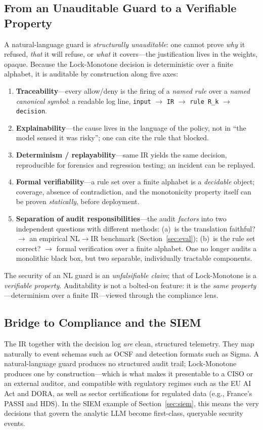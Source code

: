 \documentclass[conference]{IEEEtran}
\begin{document}
\subsection{From an Unauditable Guard to a Verifiable Property}
A natural-language guard is \emph{structurally unauditable}: one cannot
prove \emph{why} it refused, \emph{that} it will refuse, or \emph{what} it
covers---the justification lives in the weights, opaque. Because the
Lock-Monotone decision is deterministic over a finite alphabet, it is
auditable by construction along five axes:
\begin{enumerate}
\item \textbf{Traceability}---every allow/deny is the firing of a
\emph{named rule} over a \emph{named canonical symbol}: a readable log
line, \texttt{input} $\rightarrow$ \texttt{IR} $\rightarrow$
\texttt{rule R\_k} $\rightarrow$ \texttt{decision}.
\item \textbf{Explainability}---the cause lives in the language of the
policy, not in ``the model sensed it was risky''; one can cite the rule
that blocked.
\item \textbf{Determinism / replayability}---same IR yields the same
decision, reproducible for forensics and regression testing; an incident
can be replayed.
\item \textbf{Formal verifiability}---a rule set over a finite alphabet is
a \emph{decidable} object; coverage, absence of contradiction, and the
monotonicity property itself can be proven \emph{statically}, before
deployment.
\item \textbf{Separation of audit responsibilities}---the audit
\emph{factors} into two independent questions with different methods:
(a)~is the translation faithful? $\rightarrow$ an empirical
NL$\rightarrow$IR benchmark (Section~\ref{sec:eval}); (b)~is the rule set
correct? $\rightarrow$ formal verification over a finite alphabet. One no
longer audits a monolithic black box, but two separable, individually
tractable components.
\end{enumerate}
The security of an NL guard is an \emph{unfalsifiable claim}; that of
Lock-Monotone is a \emph{verifiable property}. Auditability is not a
bolted-on feature: it is the \emph{same property}---determinism over a
finite IR---viewed through the compliance lens.

\subsection{Bridge to Compliance and the SIEM}
The IR together with the decision log \emph{are} clean, structured
telemetry. They map naturally to event schemas such as OCSF and detection
formats such as Sigma. A natural-language guard produces no structured
audit trail; Lock-Monotone produces one by construction---which is what
makes it presentable to a CISO or an external auditor, and compatible with
regulatory regimes such as the EU AI Act and DORA, as well as sector
certifications for regulated data (e.g., France's PASSI and HDS). In the
SIEM example of Section~\ref{sec:siem}, this means the very decisions that
govern the analytic LLM become first-class, queryable security events.
\end{document}
